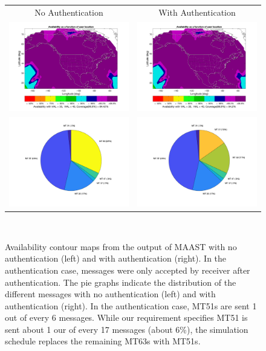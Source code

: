 \documentclass[letterpaper,times]{IONconf/IONconf}
\begin{document}
	\begin{figure}
		\centering
		\begin{tabular}{c|c} 
			No Authentication & With Authentication \\ 
			\includegraphics[width=0.47\linewidth]{fig/no_auth_avail.png} & \includegraphics[width=0.47\linewidth]{fig/auth_avail.png} \\
			\includegraphics[width=0.47\linewidth]{fig/thumbnail_no_auth_pie.png} & \includegraphics[width=0.47\linewidth]{fig/thumbnail_auth_pie.png}
		\end{tabular} \\
		\caption{
			Availability contour maps from the output of MAAST with no authentication (left) and with authentication (right).
			In the authentication case, messages were only accepted by receiver after authentication.
			The pie graphs indicate the distribution of the different messages with no authentication (left) and with authentication (right).
			In the authentication case, MT51s are sent 1 out of every 6 messages.
			While our requirement specifies MT51 is sent about 1 our of every 17 messages (about 6\%), the simulation schedule replaces the remaining MT63s with MT51s.
			}
		\label{fig:results}
	\end{figure}
\end{document}

